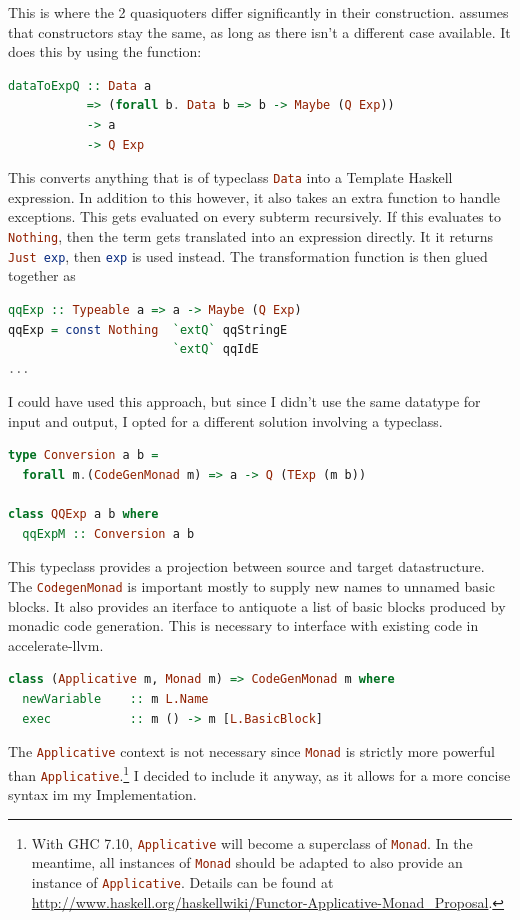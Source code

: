 \documentclass[a4paper,bibliography=totocnumbered,parskip,headsepline]{scrbook}
\begin{document}
This is where the 2 quasiquoters differ significantly in their construction.
 assumes that constructors stay the same, as long as there isn't a different case available.
It does this by using the function:
\begin{lstlisting}[language=haskell]
dataToExpQ :: Data a
           => (forall b. Data b => b -> Maybe (Q Exp))
           -> a
           -> Q Exp
\end{lstlisting}
This converts anything that is of typeclass \lstinline[language=haskell]!Data! into a Template Haskell expression.
In addition to this however, it also takes an extra function to handle exceptions.
This gets evaluated on every subterm recursively.
If this evaluates to \lstinline[language=haskell]!Nothing!, then the term gets translated into an expression directly.
It it returns \lstinline[language=haskell]!Just exp!, then \lstinline[language=haskell]!exp! is used instead.
The transformation function is then glued together as
\begin{lstlisting}[language=haskell]
qqExp :: Typeable a => a -> Maybe (Q Exp)
qqExp = const Nothing  `extQ` qqStringE
                       `extQ` qqIdE
...
\end{lstlisting}
I could have used this approach, but since I didn't use the same datatype for input and output, I opted for a different solution involving a typeclass.
\begin{lstlisting}[language=haskell]
type Conversion a b =
  forall m.(CodeGenMonad m) => a -> Q (TExp (m b))

class QQExp a b where
  qqExpM :: Conversion a b
\end{lstlisting}
This typeclass provides a projection between source and target datastructure.
The \lstinline[language=haskell]!CodegenMonad! is important mostly to supply new names to unnamed basic blocks.
It also provides an iterface to antiquote a list of basic blocks produced by monadic code generation.
This is necessary to interface with existing code in accelerate-llvm.
\begin{lstlisting}[language=haskell]
class (Applicative m, Monad m) => CodeGenMonad m where
  newVariable    :: m L.Name
  exec           :: m () -> m [L.BasicBlock]
\end{lstlisting}
The \lstinline[language=haskell]!Applicative! context is not necessary since \lstinline[language=haskell]!Monad! is strictly more powerful than \lstinline[language=haskell]!Applicative!.\footnote{With GHC 7.10, \lstinline[language=haskell]!Applicative! will become a superclass of \lstinline[language=haskell]!Monad!.
In the meantime, all instances of \lstinline[language=haskell]!Monad! should be adapted to also provide an instance of \lstinline[language=haskell]!Applicative!.
Details can be found at \url{http://www.haskell.org/haskellwiki/Functor-Applicative-Monad_Proposal}.}
I decided to include it anyway, as it allows for a more concise syntax im my Implementation.
\end{document}
